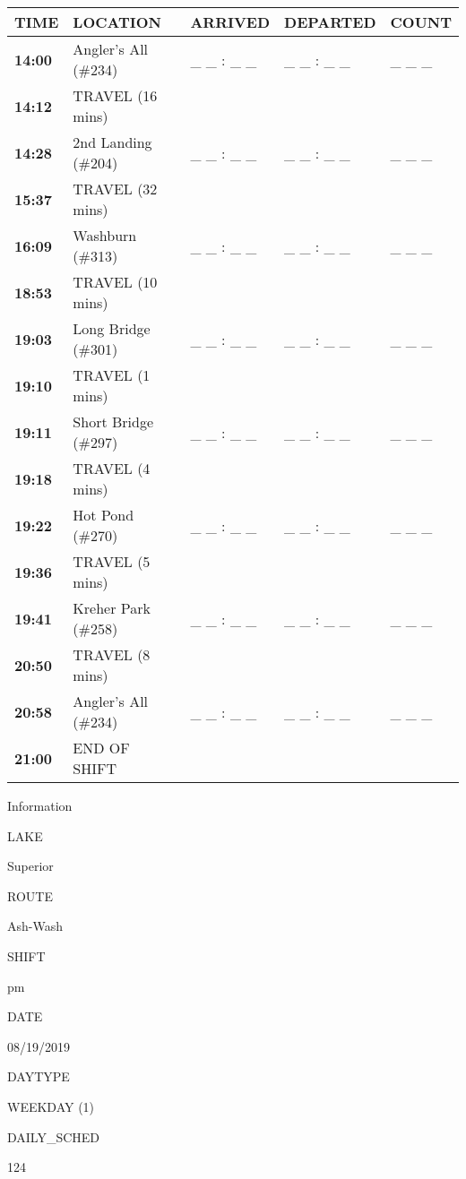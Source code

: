 \documentclass[]{article}
\begin{document}
\begin{tabular}{>{\bfseries}lllll}
\toprule
\textbf{TIME} & \textbf{LOCATION} & \textbf{ARRIVED} & \textbf{DEPARTED} & \textbf{COUNT}\\
\midrule
14:00 & Angler's All (\#234) & \_ \_ : \_ \_ & \_ \_ : \_ \_ & \_ \_ \_\\
14:12 & TRAVEL (16 mins) &  &  & \\
14:28 & 2nd Landing (\#204) & \_ \_ : \_ \_ & \_ \_ : \_ \_ & \_ \_ \_\\
15:37 & TRAVEL (32 mins) &  &  & \\
16:09 & Washburn (\#313) & \_ \_ : \_ \_ & \_ \_ : \_ \_ & \_ \_ \_\\
18:53 & TRAVEL (10 mins) &  &  & \\
19:03 & Long Bridge (\#301) & \_ \_ : \_ \_ & \_ \_ : \_ \_ & \_ \_ \_\\
19:10 & TRAVEL (1 mins) &  &  & \\
19:11 & Short Bridge (\#297) & \_ \_ : \_ \_ & \_ \_ : \_ \_ & \_ \_ \_\\
19:18 & TRAVEL (4 mins) &  &  & \\
19:22 & Hot Pond (\#270) & \_ \_ : \_ \_ & \_ \_ : \_ \_ & \_ \_ \_\\
19:36 & TRAVEL (5 mins) &  &  & \\
19:41 & Kreher Park (\#258) & \_ \_ : \_ \_ & \_ \_ : \_ \_ & \_ \_ \_\\
20:50 & TRAVEL (8 mins) &  &  & \\
20:58 & Angler's All (\#234) & \_ \_ : \_ \_ & \_ \_ : \_ \_ & \_ \_ \_\\
21:00 & END OF SHIFT &  &  & \\
\bottomrule
\end{tabular}\newpage

Information

LAKE

Superior

ROUTE

Ash-Wash

SHIFT

pm

DATE

08/19/2019

DAYTYPE

WEEKDAY (1)

DAILY\_SCHED

124

\vspace{24pt}
\end{document}
